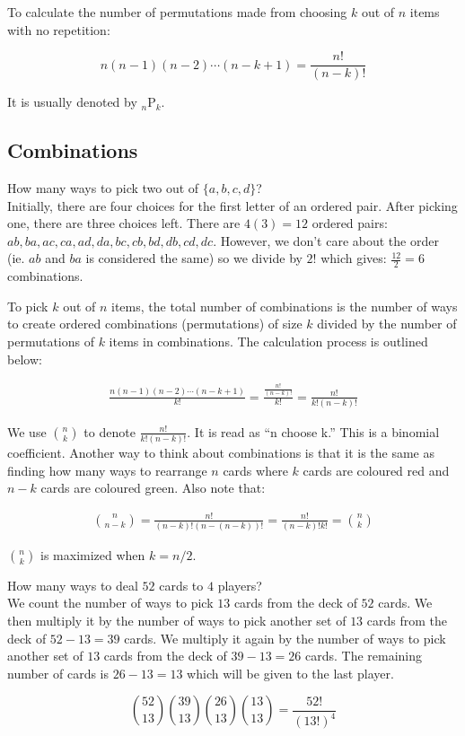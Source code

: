 To calculate the number of permutations made from choosing $k$ out of $n$ items with no repetition:

$$n(n-1)(n-2) \cdots (n-k+1)=\frac{n!}{(n-k)!}$$

It is usually denoted by ${}_n \mathrm{P}_k$.

\subsection{Combinations}

\begin{texample}
	How many ways to pick two out of $\{a, b, c, d\}$? \\
	
	Initially, there are four choices for the first letter of an ordered pair. After picking one, there are three choices left. There are $4(3)=12$ ordered pairs: $ab, ba, ac, ca, ad, da, bc, cb, bd, db, cd, dc$. However, we don't care about the order (ie. $ab$ and $ba$ is considered the same) so we divide by $2!$ which gives: $\frac{12}{2}=6$ combinations.
\end{texample}

To pick $k$ out of $n$ items, the total number of combinations is the number of ways to create ordered combinations (permutations) of size $k$ divided by the number of permutations of $k$ items in combinations. The calculation process is outlined below:

\begin{align*}
	\frac{n(n-1)(n-2) \cdots (n-k+1)}{k!} = \frac{\frac{n!}{(n-k)!}}{k!} = \frac{n!}{k!(n-k)!}
\end{align*}

We use $\binom{n}{k}$ to denote $\frac{n!}{k!(n-k)!}$. It is read as ``n choose k.'' This is a binomial coefficient. Another way to think about combinations is that it is the same as finding how many ways to rearrange $n$ cards where $k$ cards are coloured red and $n-k$ cards are coloured green. Also note that:

\begin{align*}
	\binom{n}{n-k} = \frac{n!}{(n-k)!(n-(n-k))!} = \frac{n!}{(n-k)!k!} = \binom{n}{k}
\end{align*}

$\binom{n}{k}$ is maximized when $k=n/2$.

\begin{texample}
	How many ways to deal $52$ cards to $4$ players? \\
	
	We count the number of ways to pick $13$ cards from the deck of $52$ cards. We then multiply it by the number of ways to pick another set of $13$ cards from the deck of $52-13=39$ cards. We multiply it again by the number of ways to pick another set of $13$ cards from the deck of $39-13=26$ cards. The remaining number of cards is $26-13=13$ which will be given to the last player.
	
	$$\binom{52}{13}\binom{39}{13}\binom{26}{13}\binom{13}{13}=\frac{52!}{(13!)^4}$$
\end{texample}

